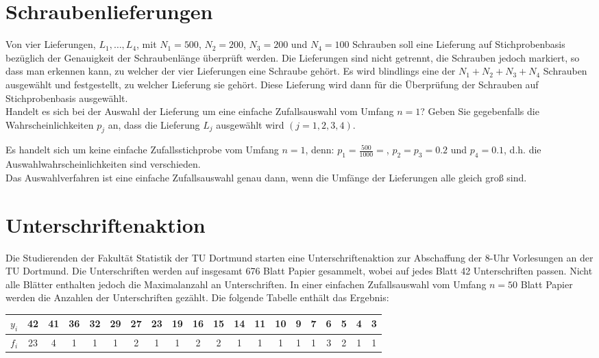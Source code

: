 \documentclass{article}
\begin{document}
\section{Schraubenlieferungen}
Von vier Lieferungen, $L_1,\dots,L_4$, mit $N_1 = 500$, $N_2=200$, $N_3 = 200$ und $N_4 = 100$ Schrauben soll eine Lieferung auf Stichprobenbasis bezüglich der Genauigkeit der Schraubenlänge überprüft werden. Die Lieferungen sind nicht getrennt, die Schrauben jedoch markiert, so dass man erkennen kann, zu welcher der vier Lieferungen eine Schraube gehört. Es wird blindlings eine der $N_1+N_2+N_3+N_4$ Schrauben ausgewählt und festgestellt, zu welcher Lieferung sie gehört. Diese Lieferung wird dann für die Überprüfung der Schrauben auf Stichprobenbasis ausgewählt.\\
Handelt es sich bei der Auswahl der Lieferung um eine einfache Zufallsauswahl vom Umfang $n=1$? Geben Sie gegebenfalls die Wahrscheinlichkeiten $p_j$ an, dass die Lieferung $L_j$ ausgewählt wird $(j=1,2,3,4)$.
\begin{solution}
Es handelt sich um keine einfache Zufallsstichprobe vom Umfang $n=1$, denn: $p_1=\frac{500}{1000}=$, $p_2=p_3=0.2$ und $p_4=0.1$, d.h. die Auswahlwahrscheinlichkeiten sind verschieden.\\
Das Auswahlverfahren ist eine einfache Zufallsauswahl genau dann, wenn die Umfänge der Lieferungen alle gleich groß sind.
\end{solution}

\section{Unterschriftenaktion}
Die Studierenden der Fakultät Statistik der TU Dortmund starten eine Unterschriftenaktion zur Abschaffung der 8-Uhr Vorlesungen an der TU Dortmund. Die Unterschriften werden auf insgesamt 676 Blatt Papier gesammelt, wobei auf jedes Blatt 42 Unterschriften passen. Nicht alle Blätter enthalten jedoch die Maximalanzahl an Unterschriften. In einer einfachen Zufallsauswahl vom Umfang $n=50$ Blatt Papier werden die Anzahlen der Unterschriften gezählt. Die folgende Tabelle enthält das Ergebnis:
\begin{center}
\begin{tabular}{c|ccccccccccccccccccc}
		$y_i$ & 42 & 41 & 36 & 32 & 29 & 27 & 23 & 19 & 16 & 15 & 14 & 11 & 10 & 9 & 7 & 6 & 5 & 4 & 3\\ \hline
		$f_i$ & 23 & 4 & 1 & 1 & 1 & 2 & 1 & 1 & 2 & 2 & 1 & 1 & 1 & 1 & 1 & 3 & 2 & 1 & 1
	\end{tabular} 
\end{center}
\end{document}
